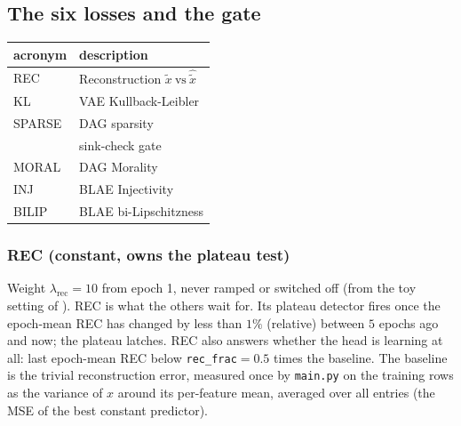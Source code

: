 \subsection{The six losses and the gate}
\label{sec:schedule:objects}
\begin{center}
\begin{tabular}{@{}ll@{}}
\toprule
acronym & description\\
\midrule
REC & Reconstruction $\tilde x\ \text{vs}\ \hat{\tilde{x}}$\\
KL & VAE Kullback-Leibler\\
SPARSE & DAG sparsity\\
 & sink-check gate\\
MORAL & DAG Morality\\
INJ & BLAE Injectivity\\
BILIP & BLAE bi-Lipschitzness\\
\bottomrule
\end{tabular}
\end{center}
\subsubsection{REC (constant, owns the plateau test)}
Weight $\lambda_{\mathrm{rec}}=10$ from epoch 1, never ramped or switched off (from
the toy setting of \cite{ngimpl}). REC is what the others wait for. Its plateau
detector fires once the epoch-mean REC has changed by less than $1\%$ (relative)
between $5$ epochs ago and now; the plateau latches. REC also answers whether the head
is learning at all: last epoch-mean REC below \texttt{rec\_frac}$=0.5$ times the
baseline. The baseline is the trivial reconstruction error, measured once by
\texttt{main.py} on the training rows as the variance of $x$ around its per-feature
mean, averaged over all entries (the MSE of the best constant predictor).

